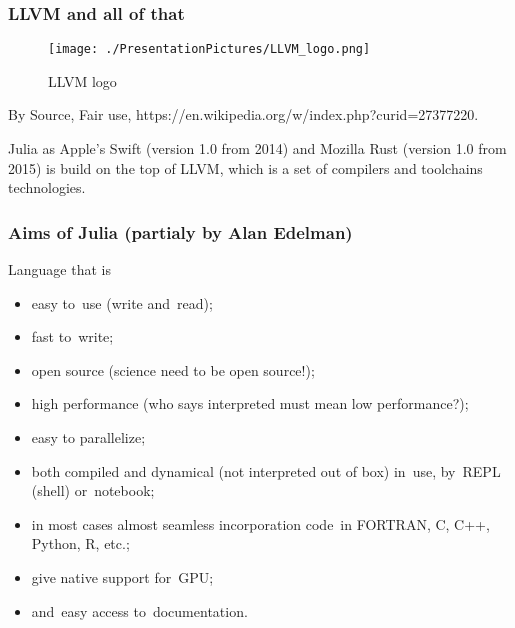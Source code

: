 \documentclass[10pt,t]{beamer}
\begin{document}
\begin{frame}
  \frametitle{LLVM and all of that}


  \begin{figure}

    \texttt{[image: ./PresentationPictures/LLVM\_logo.png]}


    \caption{LLVM logo}

  \end{figure}


  By Source, Fair use,
  {https://en.wikipedia.org/w/index.php?curid=27377220}.


  Julia as Apple's Swift (version 1.0 from 2014) and Mozilla Rust
  (version 1.0 from 2015) is build on the top of LLVM, which is a set
  of compilers and toolchains technologies.

\end{frame}





\begin{frame}
  \frametitle{Aims of Julia (partialy by Alan Edelman)}


  Language that is
  \begin{itemize}

  \item easy to~use (write and~read);

  \item fast to~write;

  \item open source (science need to be open source!);

  \item high performance (who says interpreted must mean low
    performance?);

  \item easy to parallelize;

  \item both compiled and dynamical (not interpreted out of box)
    in~use, by~REPL (shell) or~notebook;

  \item in most cases almost seamless incorporation code~in FORTRAN,
    C, C++, Python, R, etc.;

  \item give native support for~GPU;

  \item and~easy access to~documentation.

  \end{itemize}

\end{frame}
\end{document}
